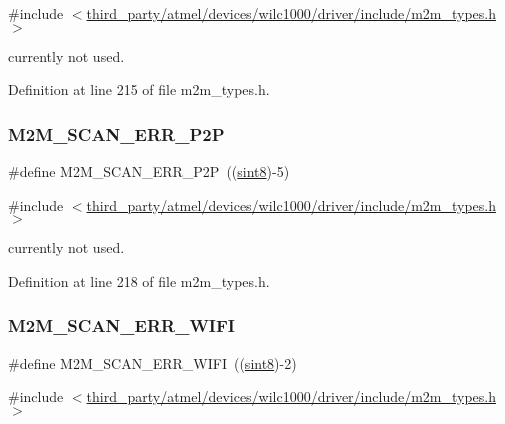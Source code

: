 {\ttfamily \#include $<$\hyperlink{m2m__types_8h}{third\+\_\+party/atmel/devices/wilc1000/driver/include/m2m\+\_\+types.\+h}$>$}

currently not used. 

Definition at line 215 of file m2m\+\_\+types.\+h.

\mbox{\label{group__WlanDefines_gae1461b3ea611371e41f64a1d05cfd6db}} 
\subsubsection{\texorpdfstring{M2\+M\+\_\+\+S\+C\+A\+N\+\_\+\+E\+R\+R\+\_\+\+P2P}{M2M\_SCAN\_ERR\_P2P}}
{\footnotesize\ttfamily \#define M2\+M\+\_\+\+S\+C\+A\+N\+\_\+\+E\+R\+R\+\_\+\+P2P~((\hyperlink{group__DataT_gae35f10ffd0ac8dd2bc3e794da9bdfbc7}{sint8})-\/5)}



{\ttfamily \#include $<$\hyperlink{m2m__types_8h}{third\+\_\+party/atmel/devices/wilc1000/driver/include/m2m\+\_\+types.\+h}$>$}

currently not used. 

Definition at line 218 of file m2m\+\_\+types.\+h.

\mbox{\label{group__WlanDefines_ga247a2194812ca3aa0e44e5622d1d879b}} 
\subsubsection{\texorpdfstring{M2\+M\+\_\+\+S\+C\+A\+N\+\_\+\+E\+R\+R\+\_\+\+W\+I\+FI}{M2M\_SCAN\_ERR\_WIFI}}
{\footnotesize\ttfamily \#define M2\+M\+\_\+\+S\+C\+A\+N\+\_\+\+E\+R\+R\+\_\+\+W\+I\+FI~((\hyperlink{group__DataT_gae35f10ffd0ac8dd2bc3e794da9bdfbc7}{sint8})-\/2)}



{\ttfamily \#include $<$\hyperlink{m2m__types_8h}{third\+\_\+party/atmel/devices/wilc1000/driver/include/m2m\+\_\+types.\+h}$>$}

